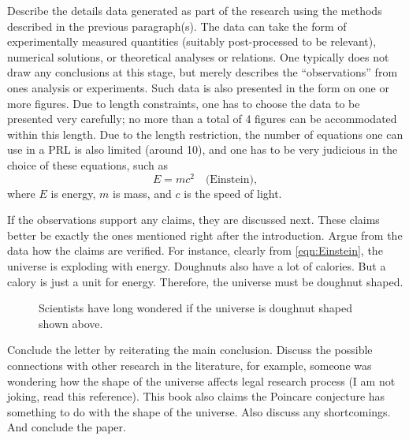 \documentclass[twocolumn,prl]{revtex4-1}
\begin{document}
Describe the details data generated as part of the research using the methods described in the previous paragraph(s). The data can take the form of experimentally measured quantities (suitably post-processed to be relevant), numerical solutions, or theoretical analyses or relations. One typically does not draw any conclusions at this stage, but merely describes the ``observations'' from ones analysis or experiments. Such data is also presented in the form on one or more figures. Due to length constraints, one has to choose the data to be presented very carefully; no more than a total of 4 figures can be accommodated within this length. Due to the length restriction, the number of equations one can use in a PRL is also limited (around 10), and one has to be very judicious in the choice of these equations, such as
\begin{equation}
E = m c^2 \quad \text{(Einstein)}, \label{eqn:Einstein}
\end{equation}
where $E$ is energy, $m$ is mass, and $c$ is the speed of light.

If the observations support any claims, they are discussed next. These claims better be exactly the ones mentioned right after the introduction. Argue from the data how the claims are verified. For instance, clearly from \eqref{eqn:Einstein}, the universe is exploding with energy. Doughnuts also have a lot of calories. But a calory is just a unit for energy. Therefore, the universe must be doughnut shaped.
\begin{figure}[htb]

\caption{Scientists have long wondered if the universe is doughnut shaped shown above.}
\label{fig:Schematic_Doughnut}
\end{figure}


Conclude the letter by reiterating the main conclusion. Discuss the possible connections with other research in the literature, for example, someone was wondering how the shape of the universe affects legal research process\cite{mills2003shape} (I am not joking, read this reference). This book\cite{oshea2009poincare} also claims the Poincare conjecture has something to do with the shape of the universe. Also discuss any shortcomings. And conclude the paper. 

\end{document}
